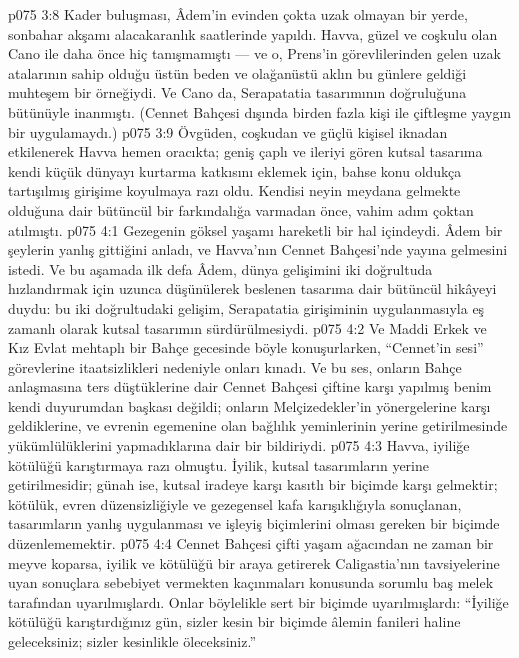 \vs p075 3:8 Kader buluşması, Âdem’in evinden çokta uzak olmayan bir yerde, sonbahar akşamı alacakaranlık saatlerinde yapıldı. Havva, güzel ve coşkulu olan Cano ile daha önce hiç tanışmamıştı --- ve o, Prens’in görevlilerinden gelen uzak atalarının sahip olduğu üstün beden ve olağanüstü aklın bu günlere geldiği muhteşem bir örneğiydi. Ve Cano da, Serapatatia tasarımının doğruluğuna bütünüyle inanmıştı. (Cennet Bahçesi dışında birden fazla kişi ile çiftleşme yaygın bir uygulamaydı.)
\vs p075 3:9 Övgüden, coşkudan ve güçlü kişisel iknadan etkilenerek Havva hemen oracıkta; geniş çaplı ve ileriyi gören kutsal tasarıma kendi küçük dünyayı kurtarma katkısını eklemek için, bahse konu oldukça tartışılmış girişime koyulmaya razı oldu. Kendisi neyin meydana gelmekte olduğuna dair bütüncül bir farkındalığa varmadan önce, vahim adım çoktan atılmıştı.
\vs p075 4:1 Gezegenin göksel yaşamı hareketli bir hal içindeydi. Âdem bir şeylerin yanlış gittiğini anladı, ve Havva’nın Cennet Bahçesi’nde yayına gelmesini istedi. Ve bu aşamada ilk defa Âdem, dünya gelişimini iki doğrultuda hızlandırmak için uzunca düşünülerek beslenen tasarıma dair bütüncül hikâyeyi duydu: bu iki doğrultudaki gelişim, Serapatatia girişiminin uygulanmasıyla eş zamanlı olarak kutsal tasarımın sürdürülmesiydi.
\vs p075 4:2 Ve Maddi Erkek ve Kız Evlat mehtaplı bir Bahçe gecesinde böyle konuşurlarken, “Cennet’in sesi” görevlerine itaatsizlikleri nedeniyle onları kınadı. Ve bu ses, onların Bahçe anlaşmasına ters düştüklerine dair Cennet Bahçesi çiftine karşı yapılmış benim kendi duyurumdan başkası değildi; onların Melçizedekler’in yönergelerine karşı geldiklerine, ve evrenin egemenine olan bağlılık yeminlerinin yerine getirilmesinde yükümlülüklerini yapmadıklarına dair bir bildiriydi.
\vs p075 4:3 Havva, iyiliğe kötülüğü karıştırmaya razı olmuştu. İyilik, kutsal tasarımların yerine getirilmesidir; günah ise, kutsal iradeye karşı kasıtlı bir biçimde karşı gelmektir; kötülük, evren düzensizliğiyle ve gezegensel kafa karışıklığıyla sonuçlanan, tasarımların yanlış uygulanması ve işleyiş biçimlerini olması gereken bir biçimde düzenlememektir.
\vs p075 4:4 Cennet Bahçesi çifti yaşam ağacından ne zaman bir meyve koparsa, iyilik ve kötülüğü bir araya getirerek Caligastia’nın tavsiyelerine uyan sonuçlara sebebiyet vermekten kaçınmaları konusunda sorumlu baş melek tarafından uyarılmışlardı. Onlar böylelikle sert bir biçimde uyarılmışlardı: “İyiliğe kötülüğü karıştırdığınız gün, sizler kesin bir biçimde âlemin fanileri haline geleceksiniz; sizler kesinlikle öleceksiniz.”
